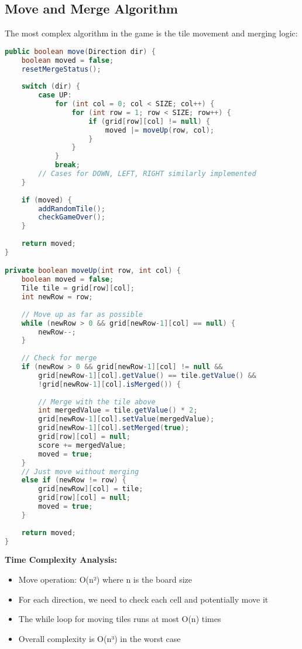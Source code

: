 \documentclass[12pt, a4paper]{article}
\begin{document}
\subsection{Move and Merge Algorithm}
The most complex algorithm in the game is the tile movement and merging logic:

\begin{lstlisting}[language=Java, caption=Move and Merge Algorithm]
public boolean move(Direction dir) {
    boolean moved = false;
    resetMergeStatus();
    
    switch (dir) {
        case UP:
            for (int col = 0; col < SIZE; col++) {
                for (int row = 1; row < SIZE; row++) {
                    if (grid[row][col] != null) {
                        moved |= moveUp(row, col);
                    }
                }
            }
            break;
        // Cases for DOWN, LEFT, RIGHT similarly implemented
    }
    
    if (moved) {
        addRandomTile();
        checkGameOver();
    }
    
    return moved;
}

private boolean moveUp(int row, int col) {
    boolean moved = false;
    Tile tile = grid[row][col];
    int newRow = row;
    
    // Move up as far as possible
    while (newRow > 0 && grid[newRow-1][col] == null) {
        newRow--;
    }
    
    // Check for merge
    if (newRow > 0 && grid[newRow-1][col] != null && 
        grid[newRow-1][col].getValue() == tile.getValue() && 
        !grid[newRow-1][col].isMerged()) {
        
        // Merge with the tile above
        int mergedValue = tile.getValue() * 2;
        grid[newRow-1][col].setValue(mergedValue);
        grid[newRow-1][col].setMerged(true);
        grid[row][col] = null;
        score += mergedValue;
        moved = true;
    } 
    // Just move without merging
    else if (newRow != row) {
        grid[newRow][col] = tile;
        grid[row][col] = null;
        moved = true;
    }
    
    return moved;
}
\end{lstlisting}

\textbf{Time Complexity Analysis:}
\begin{itemize}
    \item Move operation: O(n²) where n is the board size
    \item For each direction, we need to check each cell and potentially move it
    \item The while loop for moving tiles runs at most O(n) times
    \item Overall complexity is O(n³) in the worst case
\end{itemize}
\end{document}
